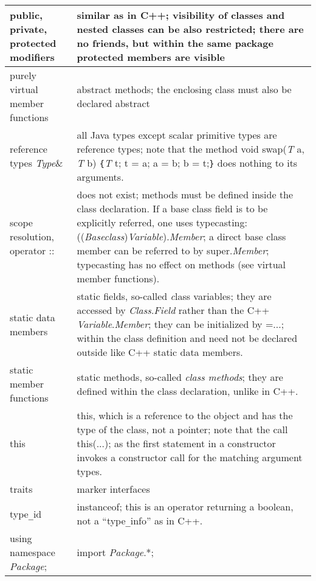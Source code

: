 \documentclass[12pt]{article}
\newcommand{\threedots}{...}
\newcommand{\mycr}{\\\hline}
\newlength{\colwidth}\setlength{\colwidth}{\textwidth}
\newenvironment{mytabular}%
{\par\noindent
\begin{longtable}[l]{%
|p{\colwidth}%
p{\colwidth}|%
}%
}%
{\end{longtable}\par\vspace{\medskipamount}\goodbreak}
\newenvironment{mytabular}
{
\begin{tabular}[t]{|ll|}
}
{
\end{tabular}
}
\newcommand{\code}[1]{{\ttfamily #1}}
\newcommand{\ital}[1]{{{\normalfont\itshape #1}}}%
\begin{document}
\begin{mytabular}
\code{public}, \code{private}, \code{protected} modifiers &
  similar as in C++; visibility of classes and nested classes can
  be also restricted; there are no friends, but within the same package
  protected members are visible\mycr

purely \code{virtual} member functions
  & \code{abstract} methods; the enclosing class
  must also be declared \code{abstract} \mycr

reference types \ital{Type}\code{\&} &
  all Java types except scalar primitive types
  are reference types; note that the
  method\newline
  \code{void swap(}\ital{T} \code{a, }\ital{T}\code{ b)}
  \verb!{!\ital{T} \code{t; t = a; a = b; b = t;}\verb!}!\newline
  does nothing to its arguments.\mycr

scope resolution, operator \code{::} &
  does not exist;  methods must be defined inside the class
  declaration.  If a base class field is to be
  explicitly referred, one uses typecasting:
  \code{((}\ital{Baseclass}\code{)}\ital{Variable}\code{).}\ital{Member};
  a direct base class member can be referred to by
  \code{super.}\ital{Member};
  typecasting has no effect on methods (see \code{virtual} member functions).
  \mycr

\code{static} data members & \code{static} fields, so-called
  {\ital class variables}; they are
  accessed by \ital{Class}\code{.}\ital{Field} rather than
  the C++ \ital{Variable}\code{.}\ital{Member}; they can
  be initialized by \code{=}\threedots\code{;} within
  the class definition and need not be declared outside
  like C++ static data members.\mycr

\code{static} member functions & \code{static} methods,
  so-called \ital{class methods}; they are defined
  within the class declaration, unlike in C++. \mycr

\code{this} & \code{this}, which is a reference to the
  object and has the type of the class,
  not a pointer; note that the call \code{this(\threedots);} as
  the first statement in a constructor invokes a
  constructor call for the matching argument types.\mycr

traits & marker interfaces\mycr

\code{type}\verb!_!\code{id} & \code{instanceof}; this is an operator
   returning a \code{boolean}, not a ``\code{type}\verb!_!\code{info}'' as
   in C++. \mycr

\code{using namespace} \ital{Package}\code{;}
  & \code{import} \ital{Package}\code{.*;}\mycr


\end{mytabular}
\end{document}
